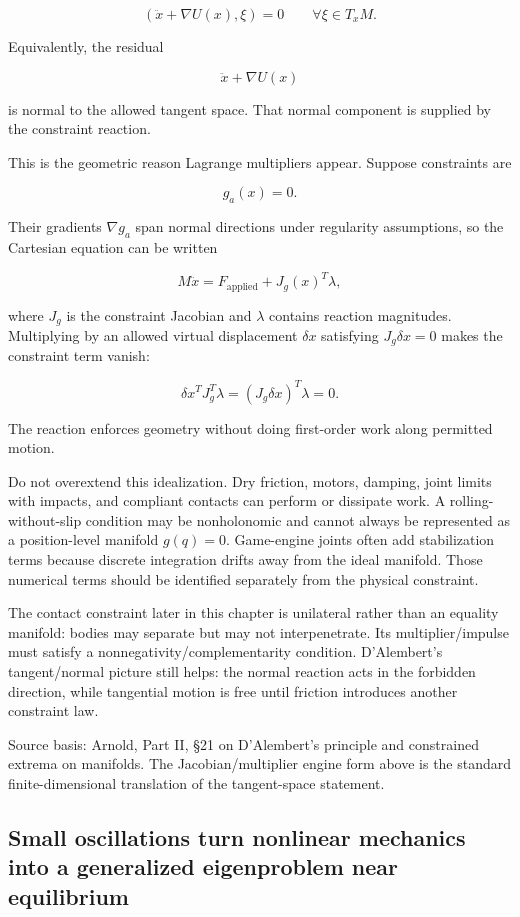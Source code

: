 \[
\left(
\ddot x+\nabla U(x),
\xi
\right)
=
0
\qquad
\forall \xi\in T_xM.
\]

Equivalently, the residual

\[
\ddot x+\nabla U(x)
\]

is normal to the allowed tangent space. That normal component is supplied by the constraint reaction.

This is the geometric reason Lagrange multipliers appear. Suppose constraints are

\[
g_a(x)=0.
\]

Their gradients \(\nabla g_a\) span normal directions under regularity assumptions, so the Cartesian equation can be written

\[
M\ddot x
=
F_{\mathrm{applied}}
+
J_g(x)^T\lambda,
\]

where \(J_g\) is the constraint Jacobian and \(\lambda\) contains reaction magnitudes. Multiplying by an allowed virtual displacement \(\delta x\) satisfying \(J_g\delta x=0\) makes the constraint term vanish:

\[
\delta x^T J_g^T\lambda
=
(J_g\delta x)^T\lambda
=
0.
\]

The reaction enforces geometry without doing first-order work along permitted motion.

Do not overextend this idealization. Dry friction, motors, damping, joint limits with impacts, and compliant contacts can perform or dissipate work. A rolling-without-slip condition may be nonholonomic and cannot always be represented as a position-level manifold \(g(q)=0\). Game-engine joints often add stabilization terms because discrete integration drifts away from the ideal manifold. Those numerical terms should be identified separately from the physical constraint.

The contact constraint later in this chapter is unilateral rather than an equality manifold: bodies may separate but may not interpenetrate. Its multiplier/impulse must satisfy a nonnegativity/complementarity condition. D'Alembert's tangent/normal picture still helps: the normal reaction acts in the forbidden direction, while tangential motion is free until friction introduces another constraint law.

Source basis: Arnold, Part II, §21 on D'Alembert's principle and constrained extrema on manifolds. The Jacobian/multiplier engine form above is the standard finite-dimensional translation of the tangent-space statement.

\subsection{Small oscillations turn nonlinear mechanics into a generalized eigenproblem near equilibrium}\label{06-engine-ii-ch033-small-oscillations-turn-nonlinear-mechanics-into-a-generalized-eigenproblem-near-equilibrium}


